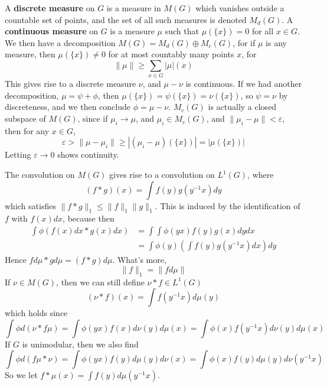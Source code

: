 A {\bf discrete measure} on $G$ is a measure in $M(G)$ which vanishes outside a countable set of points, and the set of all such measures is denoted $M_d(G)$. A {\bf continuous measure} on $G$ is a measure $\mu$ such that $\mu(\{x\}) = 0$ for all $x \in G$. We then have a decomposition $M(G) = M_d(G) \oplus M_c(G)$, for if $\mu$ is any measure, then $\mu(\{x\}) \neq 0$ for at most countably many points $x$, for
%
\[ \| \mu \| \geq \sum_{x \in G} |\mu|(x) \]
%
This gives rise to a discrete measure $\nu$, and $\mu - \nu$ is continuous. If we had another decomposition, $\mu = \psi + \phi$, then $\mu(\{x\}) = \psi(\{x\}) = \nu(\{x\})$, so $\psi = \nu$ by discreteness, and we then conclude $\phi = \mu - \nu$. $M_c(G)$ is actually a closed subspace of $M(G)$, since if $\mu_i \to \mu$, and $\mu_i \in M_c(G)$, and $\| \mu_i - \mu \| < \varepsilon$, then for any $x \in G$,
%
\[ \varepsilon > \| \mu - \mu_i \| \geq |(\mu_i - \mu)(\{x\})| = |\mu(\{ x \})| \]
%
Letting $\varepsilon \to 0$ shows continuity.

The convolution on $M(G)$ gives rise to a convolution on $L^1(G)$, where
%
\[ (f*g)(x) = \int f(y) g(y^{-1}x) dy \]
%
which satisfies $\| f*g \|_1 \leq \| f \|_1 \| g \|_1$. This is induced by the identification of $f$ with $f(x) dx$, because then
%
\begin{align*}
    \int \phi (f(x) dx * g(x) dx) &= \int \int \phi(yx) f(y) g(x) dy dx\\
    &= \int \phi(y) \left( \int f(y) g(y^{-1}x) dx \right) dy
\end{align*}
%
Hence $f d\mu * g d\mu = (f * g) d\mu$. What's more,
%
\[ \| f \|_1 = \| f d\mu \| \]
%
If $\nu \in M(G)$, then we can still define $\nu * f \in L^1(G)$
%
\[ (\nu * f)(x) = \int f(y^{-1}x) d\mu(y) \]
%
which holds since
%
\[ \int \phi d(\nu * f \mu) = \int \phi(yx) f(x) d\nu(y) d\mu(x) = \int \phi(x) f(y^{-1}x) d\nu(y) d\mu(x) \]
%
If $G$ is unimodular, then we also find
%
\[ \int \phi d(f \mu * \nu) = \int \phi(yx) f(y) d\mu(y) d\nu(x) = \int \phi(x) f(y) d\mu(y) d\nu(y^{-1}x) \]
%
So we let $f * \mu(x) = \int f(y) d\mu(y^{-1}x)$.

